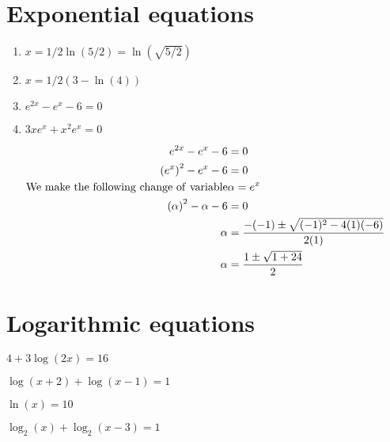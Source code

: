 \documentclass[../main.tex]{subfiles}
\begin{document}
\section{Exponential equations}

\begin{comment}
\begin{enumerate}
    \item $8e^{2x} = 20$
    \item $e^{3-2x} = 4$
    \item $e^{2x}-e^{x}-6=0$
    \item $3xe^x + x^2e^x = 0 $
\end{enumerate}
\end{comment}

\begin{enumerate}
    \item $x = 1/2 \ln(5/2) = \ln(\sqrt{5/2})$
    \item $x = 1/2 (3-\ln(4))$
    \item $e^{2x}-e^{x}-6=0$ %
    \item $3xe^x + x^2e^x = 0 $ %
\end{enumerate}


\begin{align*}
    e^{2x}-e^x-6 &= 0 \\
    \qty(e^{x})^{2}-e^x-6 &= 0 \\
    \mathrm{We~make~the~following~change~of~variable} & \alpha = e^x \\
    \qty(\alpha)^2-\alpha-6 &= 0 \\
    \alpha &= \frac{-(-1)\pm\sqrt{(-1)^2-4(1)(-6)}}{2(1)} \\
    \alpha &= \frac{1\pm\sqrt{1+24}}{2} \\
\end{align*}


\section{Logarithmic equations}

\begin{enumerate}
    \begin{minipage}[c]{0.45\textwidth}
        \item $4+3\log(2x)=16$
        \item $\log(x+2) + \log(x-1) = 1$
    \end{minipage}
    \begin{minipage}[c]{0.45\textwidth}
        \item $\ln(x) = 10$
        \item $\log_2(x) + \log_2(x-3) = 1$
    \end{minipage}
\end{enumerate}
\end{document}
